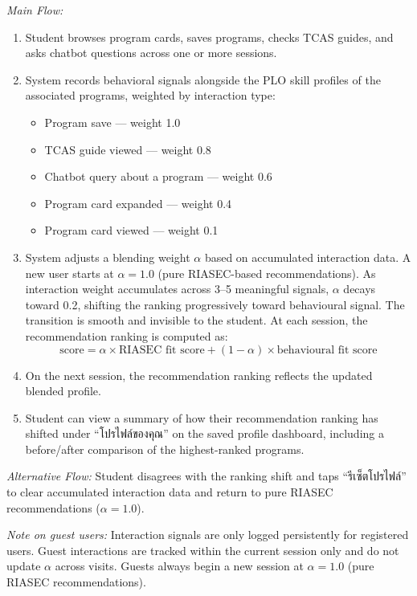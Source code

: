 \noindent\textit{Main Flow:}
\begin{enumerate}[leftmargin=80pt]
    \item Student browses program cards, saves programs, checks TCAS guides, and asks chatbot questions across one or more sessions.
    \item System records behavioral signals alongside the PLO skill profiles of the associated programs, weighted by interaction type:
    \begin{itemize}[leftmargin=40pt]
        \item Program save --- weight 1.0
        \item TCAS guide viewed --- weight 0.8
        \item Chatbot query about a program --- weight 0.6
        \item Program card expanded --- weight 0.4
        \item Program card viewed --- weight 0.1
    \end{itemize}
    \item System adjusts a blending weight $\alpha$ based on accumulated interaction data. A new user starts at $\alpha = 1.0$ (pure RIASEC-based recommendations). As interaction weight accumulates across 3--5 meaningful signals, $\alpha$ decays toward 0.2, shifting the ranking progressively toward behavioural signal. The transition is smooth and invisible to the student. At each session, the recommendation ranking is computed as:
    \[\text{score} = \alpha \times \text{RIASEC fit score} + (1 - \alpha) \times \text{behavioural fit score}\]
    \item On the next session, the recommendation ranking reflects the updated blended profile.
    \item Student can view a summary of how their recommendation ranking has shifted under ``โปรไฟล์ของคุณ'' on the saved profile dashboard, including a before/after comparison of the highest-ranked programs.
\end{enumerate}

\noindent\textit{Alternative Flow:} Student disagrees with the ranking shift and taps ``รีเซ็ตโปรไฟล์'' to clear accumulated interaction data and return to pure RIASEC recommendations ($\alpha = 1.0$).

\noindent\textit{Note on guest users:} Interaction signals are only logged persistently for registered users. Guest interactions are tracked within the current session only and do not update $\alpha$ across visits. Guests always begin a new session at $\alpha = 1.0$ (pure RIASEC recommendations).

